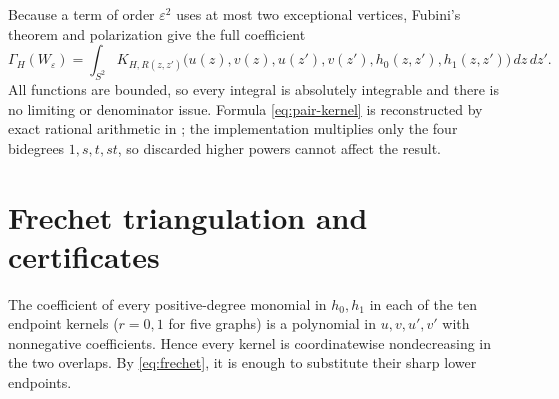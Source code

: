 \documentclass[11pt]{article}
\begin{document}
Because a term of order $\varepsilon^2$ uses at most two exceptional
vertices, Fubini's theorem and polarization give the full coefficient
\begin{equation}
 [\varepsilon^2]\Gamma_H(W_\varepsilon)
 =\int_{S^2}K_{H,R(z,z')}
 \bigl(u(z),v(z),u(z'),v(z'),h_0(z,z'),h_1(z,z')\bigr)
 \,dz\,dz'.
 \label{eq:integrated-kernel}
\end{equation}
All functions are bounded, so every integral is absolutely integrable and
there is no limiting or denominator issue.  Formula \eqref{eq:pair-kernel}
is reconstructed by exact rational arithmetic in
; the implementation multiplies
only the four bidegrees $1,s,t,st$, so discarded higher powers cannot affect
the result.

\section{Frechet triangulation and certificates}

The coefficient of every positive-degree monomial in $h_0,h_1$ in each of
the ten endpoint kernels ($r=0,1$ for five graphs) is a polynomial in
$u,v,u',v'$ with nonnegative coefficients.  Hence every kernel is
coordinatewise nondecreasing in the two overlaps.  By
\eqref{eq:frechet}, it is enough to substitute their sharp lower endpoints.
\end{document}
